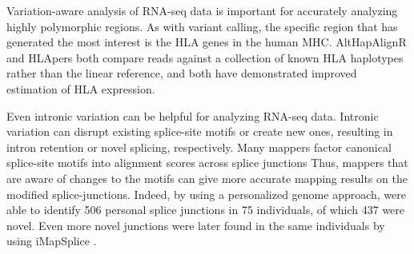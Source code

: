 Variation-aware analysis of RNA-seq data is important for accurately analyzing highly polymorphic regions.
As with variant calling, the specific region that has generated the most interest is the HLA genes in the human MHC. 
AltHapAlignR \cite{Lee_2018} and HLApers \cite{Aguiar2019-fy} both compare reads against a collection of known HLA haplotypes rather than the linear reference, and both have demonstrated improved estimation of HLA expression.

Even intronic variation can be helpful for analyzing RNA-seq data. 
Intronic variation can disrupt existing splice-site motifs or create new ones, resulting in intron retention or novel splicing, respectively. 
Many mappers factor canonical splice-site motifs into alignment scores across splice junctions
Thus, mappers that are aware of changes to the motifs can give more accurate mapping results on the modified splice-junctions. 
Indeed, by using a personalized genome approach, \citeauthor{Stein_2015} \cite{Stein_2015} were able to identify 506 personal splice junctions in 75 individuals, of which 437 were novel.
Even more novel junctions were later found in the same individuals by \citeauthor{Liu_2018} using iMapSplice \cite{Liu_2018}.


%

